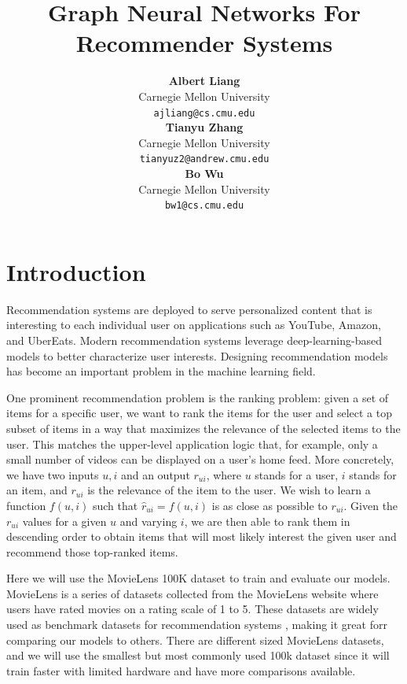 \documentclass{article}
\title{Graph Neural Networks For Recommender Systems}
\author{
  \textbf{Albert Liang}  \\
  Carnegie Mellon University \\
  \texttt{ajliang@cs.cmu.edu} \\
  \And
  \textbf{Tianyu Zhang} \\
  Carnegie Mellon University \\
  \texttt{tianyuz2@andrew.cmu.edu} \\
  \And
  \textbf{Bo Wu} \\
  Carnegie Mellon University \\
  \texttt{bw1@cs.cmu.edu} \\
}
\begin{document}
\maketitle



\section{Introduction} \label{intro}


Recommendation systems are deployed to serve personalized content that is interesting to each individual user on applications such as YouTube, Amazon, and UberEats. Modern recommendation systems leverage deep-learning-based models to better characterize user interests. Designing recommendation models has become an important problem in the machine learning field.

One prominent recommendation problem is the ranking problem: given a set of items for a specific user, we want to rank the items for the user and select a top subset of items in a way that maximizes the relevance of the selected items to the user. This matches the upper-level application logic that, for example, only a small number of videos can be displayed on a user's home feed. More concretely, we have two inputs $u,i$ and an output $r_{ui}$, where $u$ stands for a user, $i$ stands for an item, and $r_{ui}$ is the relevance of the item to the user. We wish to learn a function $f(u,i)$ such that $\hat{r}_{ui}=f(u,i)$ is as close as possible to $r_{ui}$. Given the $r_{ui}$ values for a given $u$ and varying $i$, we are then able to rank them in descending order to obtain items that will most likely interest the given user and recommend those top-ranked items.

Here we will use the MovieLens 100K \cite{movielens} dataset to train and evaluate our models. MovieLens is a series of datasets collected from the MovieLens website where users have rated movies on a rating scale of 1 to 5. These datasets are widely used as benchmark datasets for recommendation systems \cite{DBLP:journals/corr/abs-2011-02260}, making it great forr comparing our models to others. There are different sized MovieLens datasets, and we will use the smallest but most commonly used 100k dataset since it will train faster with limited hardware and have more comparisons available. 
\end{document}
